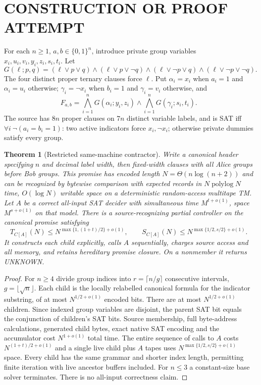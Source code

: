 \documentclass{article}
\newtheorem{theorem}{Theorem}
\begin{document}
\section{CONSTRUCTION OR PROOF ATTEMPT}
For each $n\ge1$, $a,b\in\{0,1\}^n$, introduce private group variables $x_i,u_i,v_i,y_i,z_i,s_i,t_i$. Let
\[
G(\ell;p,q)=
(\ell\vee p\vee q)\wedge(\ell\vee p\vee\neg q)
\wedge(\ell\vee\neg p\vee q)\wedge(\ell\vee\neg p\vee\neg q).
\]
The four distinct proper ternary clauses force $\ell$. Put $\alpha_i=x_i$ when $a_i=1$ and $\alpha_i=u_i$ otherwise; $\gamma_i=\neg x_i$ when $b_i=1$ and $\gamma_i=v_i$ otherwise, and
\[
F_{a,b}=\bigwedge_{i=1}^nG(\alpha_i;y_i,z_i)\wedge
\bigwedge_{i=1}^nG(\gamma_i;s_i,t_i).
\]
The source has $8n$ proper clauses on $7n$ distinct variable labels, and is SAT iff $\forall i\ \neg(a_i=b_i=1)$: two active indicators force $x_i,\neg x_i$; otherwise private dummies satisfy every group.
\begin{theorem}[Restricted same-machine contractor]
Write a canonical header specifying $n$ and decimal label width, then fixed-width clauses with all Alice groups before Bob groups. This promise has encoded length $N=\Theta(n\log(n+2))$ and can be recognized by bytewise comparison with expected records in $N\operatorname{polylog}N$ time, $O(\log N)$ writable space on a deterministic random-access multitape TM. Let $A$ be a correct all-input SAT decider with simultaneous time $M^{t+o(1)}$, space $M^{s+o(1)}$ on that model. There is a source-recognizing partial controller on the canonical promise satisfying
\[
T_{C[A]}(N)\le N^{\max\{1,(1+t)/2\}+o(1)},\qquad
S_{C[A]}(N)\le N^{\max\{1/2,s/2\}+o(1)}.
\]
It constructs each child explicitly, calls $A$ sequentially, charges source access and all memory, and retains hereditary promise closure. On a nonmember it returns UNKNOWN.
\end{theorem}
\begin{proof}
For $n\ge4$ divide group indices into $r=\lceil n/g\rceil$ consecutive intervals, $g=\lfloor\sqrt n\rfloor$. Each child is the locally relabelled canonical formula for the indicator substring, of at most $N^{1/2+o(1)}$ encoded bits. There are at most $N^{1/2+o(1)}$ children. Since indexed group variables are disjoint, the parent SAT bit equals the conjunction of children's SAT bits. Source membership, full byte-address calculations, generated child bytes, exact native SAT encoding and the accumulator cost $N^{1+o(1)}$ total time. The entire sequence of calls to $A$ costs $N^{(1+t)/2+o(1)}$ and a single live child plus $A$ tapes uses $N^{\max\{1/2,s/2\}+o(1)}$ space. Every child has the same grammar and shorter index length, permitting finite iteration with live ancestor buffers included. For $n\le3$ a constant-size base solver terminates. There is no all-input correctness claim.
\end{proof}
\end{document}
